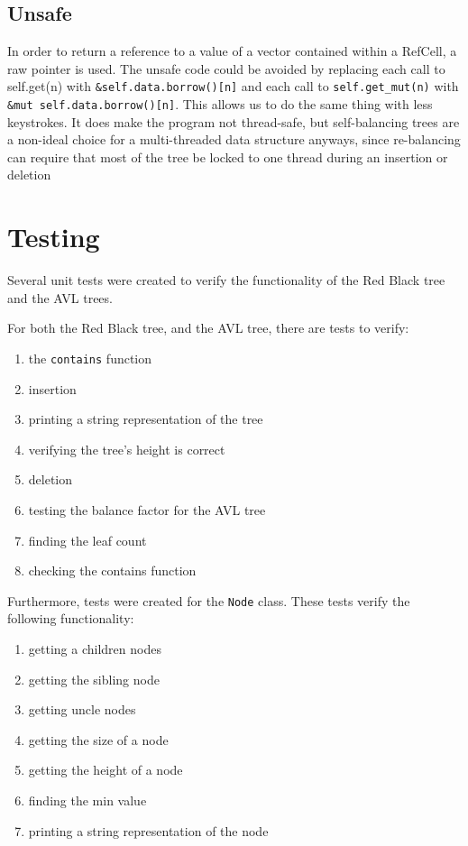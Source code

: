 \documentclass[letterpaper]{article}
\begin{document}
\subsection{Unsafe}
In order to return a reference to a value of a vector contained within a
RefCell, a raw pointer is used. The unsafe code could be avoided by replacing
each call to self.get(n) with \texttt{\&self.data.borrow()[n]} and each call to
\texttt{self.get\_mut(n)} with \texttt{\&mut self.data.borrow()[n]}. This allows
us to do the same thing with less keystrokes. It does make the program not
thread-safe, but self-balancing trees are a non-ideal choice for a
multi-threaded data structure anyways, since re-balancing can require that most
of the tree be locked to one thread during an insertion or deletion

\section{Testing}
Several unit tests were created to verify the functionality of the Red Black
tree and the AVL trees.

For both the Red Black tree, and the AVL tree, there are tests to verify:
\begin{enumerate}
	\item the \texttt{contains} function
	\item insertion
	\item printing a string representation of the tree
	\item verifying the tree's height is correct
	\item deletion
	\item testing the balance factor for the AVL tree
	\item finding the leaf count
	\item checking the contains function
\end{enumerate}

Furthermore, tests were created for the \texttt{Node} class. These tests verify
the following functionality:
\begin{enumerate}
	\item getting a children nodes
	\item getting the sibling node
	\item getting uncle nodes
	\item getting the size of a node
	\item getting the height of a node
	\item finding the min value
	\item printing a string representation of the node
\end{enumerate}
\end{document}
